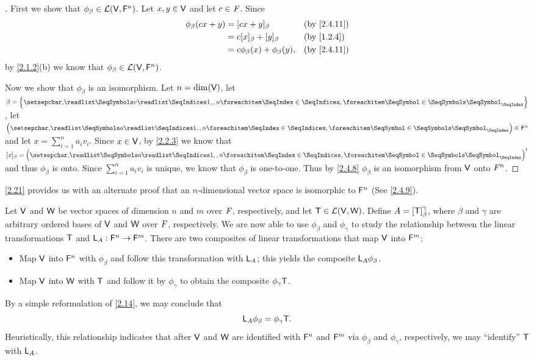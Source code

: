 \begin{proof}[]
  First we show that \(\phi_{\beta} \in \mathcal{L}(\mathsf{V}, \mathsf{F}^n)\).
  Let \(x, y \in \mathsf{V}\) and let \(c \in \mathit{F}\).
  Since
  \begin{align*}
    \phi_{\beta}(cx + y) & = [cx + y]_{\beta}                     &  & \text{(by \cref{2.4.11})} \\
                         & = c [x]_{\beta} + [y]_{\beta}          &  & \text{(by \cref{1.2.4})}  \\
                         & = c \phi_{\beta}(x) + \phi_{\beta}(y), &  & \text{(by \cref{2.4.11})}
  \end{align*}
  by \cref{2.1.2}(b) we know that \(\phi_{\beta} \in \mathcal{L}(\mathsf{V}, \mathsf{F}^n)\).

  Now we show that \(\phi_{\beta}\) is an isomorphism.
  Let \(n = \dim(\mathsf{V})\), let \(\beta = \set{\seq{v}{1,,n}}\), let \(\tuple{a}{1,,n} \in \vs{F}^n\) and let \(x = \sum_{i = 1}^n a_i v_i\).
  Since \(x \in \mathsf{V}\), by \cref{2.2.3} we know that \([x]_{\beta} = \tp{\tuple{a}{1,,n}}\) and thus \(\phi_{\beta}\) is onto.
  Since \(\sum_{i = 1}^n a_i v_i\) is unique, we know that \(\phi_{\beta}\) is one-to-one.
  Thus by \cref{2.4.8} \(\phi_{\beta}\) is an isomorphism from \(\mathsf{V}\) onto \(\mathsf{\mathit{F}}^n\).
\end{proof}

\begin{note}
  \cref{2.21} provides us with an alternate proof that an \(n\)-dimensional vector space is isomorphic to \(\mathsf{F}^n\)
  (See \cref{2.4.9}).
\end{note}

\begin{cor}\label{2.4.12}
  Let \(\mathsf{V}\) and \(\mathsf{W}\) be vector spaces of dimension \(n\) and \(m\) over \(\mathit{F}\), respectively, and let \(\mathsf{T} \in \mathcal{L}(\mathsf{V}, \mathsf{W})\).
  Define \(A = [\mathsf{T}]_{\beta}^{\gamma}\), where \(\beta\) and \(\gamma\) are arbitrary ordered bases of \(\mathsf{V}\) and \(\mathsf{W}\) over \(\mathit{F}\), respectively.
  We are now able to use \(\phi_{\beta}\) and \(\phi_{\gamma}\) to study the relationship between the linear transformations \(\mathsf{T}\) and \(\mathsf{L}_A : \mathsf{F}^n \to \mathsf{F}^m\).
  There are two composites of linear transformations that map \(\mathsf{V}\) into \(\mathsf{F}^m\):
  \begin{itemize}
    \item Map \(\mathsf{V}\) into \(\mathsf{F}^n\) with \(\phi_{\beta}\) and follow this transformation with \(\mathsf{L}_A\);
          this yields the composite \(\mathsf{L}_A \phi_{\beta}\).
    \item Map \(\mathsf{V}\) into \(\mathsf{W}\) with \(\mathsf{T}\) and follow it by \(\phi_{\gamma}\) to obtain the composite \(\phi_{\gamma} \mathsf{T}\).
  \end{itemize}
  By a simple reformulation of \cref{2.14}, we may conclude that
  \[
    \mathsf{L}_A \phi_{\beta} = \phi_{\gamma} \mathsf{T}.
  \]
  Heuristically, this relationship indicates that after \(\mathsf{V}\) and \(\mathsf{W}\) are identified with \(\mathsf{F}^n\) and \(\mathsf{F}^m\) via \(\phi_{\beta}\) and \(\phi_{\gamma}\), respectively, we may ``identify'' \(\mathsf{T}\) with \(\mathsf{L}_A\).
\end{cor}

